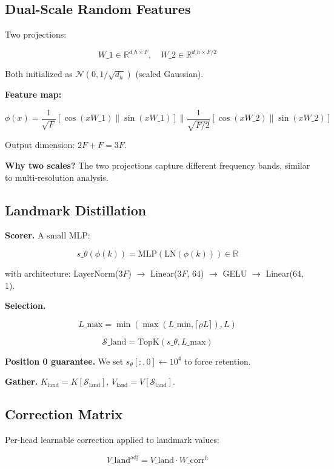 \subsection{Dual-Scale Random Features}

Two projections:

\[
W\_1 \in \mathbb{R}^{d\_h \times F}, \quad W\_2 \in \mathbb{R}^{d\_h \times F/2}
\tag{4.1}
\]

Both initialized as $\mathcal{N}(0, 1/\sqrt{d_h})$ (scaled Gaussian).

\textbf{Feature map:}

\[
\phi(x) = \frac{1}{\sqrt{F}} [\cos(x W\_1) \| \sin(x W\_1)] \| \frac{1}{\sqrt{F/2}} [\cos(x W\_2) \| \sin(x W\_2)]
\tag{4.2}
\]

Output dimension: $2F + F = 3F$.

\textbf{Why two scales?} The two projections capture different frequency 
bands, similar to multi-resolution analysis.

\subsection{Landmark Distillation}

\textbf{Scorer.} A small MLP:

\[
s\_\theta(\phi(k)) = \text{MLP}(\text{LN}(\phi(k))) \in \mathbb{R}
\tag{4.3}
\]

with architecture: LayerNorm($3F$) $\to$ Linear($3F$, 64) $\to$ GELU $\to$ Linear(64, 1).

\textbf{Selection.}

\[
L\_\text{max} = \min\!\left(\max(L\_\text{min}, \lceil \rho L \rceil), L\right)
\tag{4.4}
\]

\[
\mathcal{S}\_\text{land} = \text{TopK}(s\_\theta, L\_\text{max})
\tag{4.5}
\]

\textbf{Position 0 guarantee.} We set $s_\theta[:, 0] \leftarrow 10^4$ to force 
retention.

\textbf{Gather.} $K_\text{land} = K[\mathcal{S}_\text{land}]$, $V_\text{land} = V[\mathcal{S}_\text{land}]$.

\subsection{Correction Matrix}

Per-head learnable correction applied to landmark values:

\[
V\_\text{land}^\text{adj} = V\_\text{land} \cdot W\_\text{corr}^h
\tag{4.6}
\]

